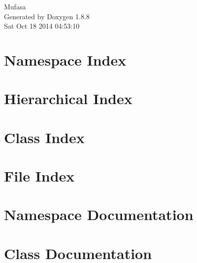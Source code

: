 \documentclass[twoside]{book}
\newcommand{\+}{\discretionary{\mbox{\scriptsize$\hookleftarrow$}}{}{}}
\newcommand{\clearemptydoublepage}{%
  \newpage{\pagestyle{empty}\cleardoublepage}%
}
\begin{document}
\hypersetup{pageanchor=false,
             bookmarks=true,
             bookmarksnumbered=true,
             pdfencoding=unicode
            }
\begin{titlepage}
\vspace*{7cm}
\begin{center}%
{\Large Mufasa }\\
\vspace*{1cm}
{\large Generated by Doxygen 1.8.8}\\
\vspace*{0.5cm}
{\small Sat Oct 18 2014 04:53:10}\\
\end{center}
\end{titlepage}
\clearemptydoublepage
\tableofcontents
\clearemptydoublepage
{}
\hypersetup{pageanchor=true}

\chapter{Namespace Index}

\chapter{Hierarchical Index}

\chapter{Class Index}

\chapter{File Index}

\chapter{Namespace Documentation}






\chapter{Class Documentation}














\end{document}
